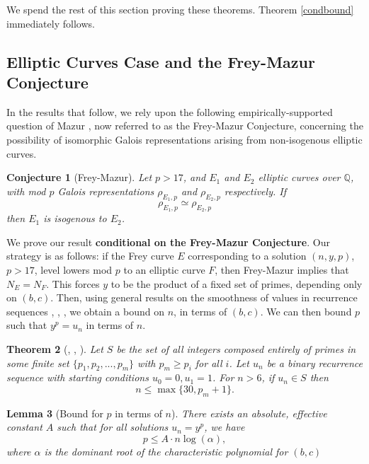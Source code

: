 \documentclass[12pt]{amsart}
\newtheorem{thm}{Theorem}[section]
\newtheorem{lem}[thm]{Lemma}
\newtheorem{conj}[thm]{Conjecture}
\theoremstyle{definition}
\def\Q{{\mathbb Q}}
\begin{document}
We spend the rest of this section proving these theorems. Theorem \ref{condbound} immediately follows.


\subsection{Elliptic Curves Case and the Frey-Mazur Conjecture}

In the results that follow, we rely upon the following empirically-supported question of Mazur \cite{mazur78}, now referred to as the Frey-Mazur Conjecture, concerning the possibility of isomorphic Galois representations arising from non-isogenous elliptic curves.

\begin{conj}[Frey-Mazur]\label{FreyMazur}
Let $p > 17$, and $E_1$ and $E_2$ elliptic curves over $\Q$, with mod $p$ Galois representations $\rho_{E_1,p}$ and $\rho_{E_2,p}$ respectively.  If
\[ \rho_{E_1,p} \simeq \rho_{E_2,p} \]
then $E_1$ is isogenous to $E_2$.
\end{conj}

We prove our result \textbf{conditional on the Frey-Mazur Conjecture}. Our strategy is as follows: if the Frey curve $E$ corresponding to a solution $(n,y,p)$, $p > 17$, level lowers mod $p$ to an elliptic curve $F$, then Frey-Mazur implies that $N_E = N_F$. This forces $y$ to be the product of a fixed set of primes, depending only on $(b,c)$. Then, using general results on the smoothness of values in recurrence sequences \cite{gyory81}, \cite{gyory82}, \cite{gyory03}, we obtain a bound on $n$, in terms of $(b,c)$. We can then bound $p$ such that $y^p = u_n$ in terms of $n$.


\begin{thm}[\cite{gyory81}, \cite{gyory82}, \cite{gyory03}]\label{smoothterm}
Let $S$ be the set of all integers composed entirely of primes in some finite set $\{p_1,p_2,...,p_m\}$ with $p_m \geq p_i$ for all $i$.  Let $u_n$ be a binary recurrence sequence with starting conditions $u_0 = 0, u_1 = 1$.  For $n > 6$, if $u_n \in S$ then
\[ n \leq \max\{30, p_m +1 \}. \]
\end{thm}

\begin{lem}[Bound for $p$ in terms of $n$]\label{boundpintermsn}
There exists an absolute, effective constant $A$ such that for all solutions $u_n = y^p$, we have 
\[ p \leq A \cdot n \log(\alpha), \]
where $\alpha$ is the dominant root of the characteristic polynomial for $(b,c)$
\end{lem}
\end{document}
